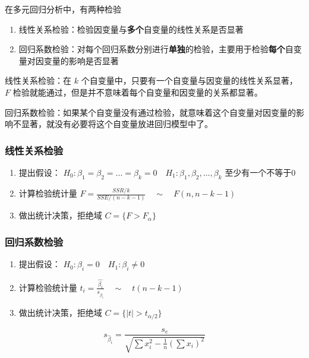 \documentclass[UTF8,10pt]{book}
\begin{document}
在多元回归分析中，有两种检验

\begin{enumerate}
	\def\labelenumi{\arabic{enumi}.}
	\item
	线性关系检验：检验因变量与\textbf{多个}自变量的线性关系是否显著
	\item
	回归系数检验：对每个回归系数分别进行\textbf{单独}的检验，主要用于检验\textbf{每个}自变量对因变量的影响是否显著
\end{enumerate}

线性关系检验：在 \(k\)
个自变量中，只要有一个自变量与因变量的线性关系显著， \(F\)
检验就能通过，但是并不意味着每个自变量和因变量的关系都显著。

回归系数检验：如果某个自变量没有通过检验，就意味着这个自变量对因变量的影响不显著，就没有必要将这个自变量放进回归模型中了。

\subsubsection{线性关系检验}\label{header-n238}

\begin{enumerate}
	\def\labelenumi{\arabic{enumi}.}
	\item
	提出假设：
	\(H_0 : \beta_1 = \beta_2 = ... = \beta_k = 0  \quad H_1 : \beta_1 , \beta_2 , ... , \beta_k\)
	至少有一个不等于0
	\item
	计算检验统计量
	\(F = \frac{SSR/k}{SSE/(n-k-1)} \quad \sim \quad F(n,n-k-1)\) 
	\item
	做出统计决策，拒绝域 \( C = \{ F>F_{\alpha} \} \)
\end{enumerate}

\subsubsection{回归系数检验}\label{header-n246}

\begin{enumerate}
	\def\labelenumi{\arabic{enumi}.}
	\item
	提出假设： \(H_0 : \beta_i = 0  \quad H_1 : \beta_i \neq 0\) 
	\item
	计算检验统计量
	\(t_i = \frac{\hat{\beta_i}}{s_{\hat{\beta_i}}} \quad \sim \quad t(n-k-1)\)
	\item
	做出统计决策，拒绝域 \( C = \{ |t|>t_{\alpha / 2} \} \)
\end{enumerate}

\[s_{\hat{\beta}_i} = \frac{s_e}{\sqrt{\sum x_i^2 - \frac{1}{n}\left(\sum x_i\right)^2}}\]
\end{document}
